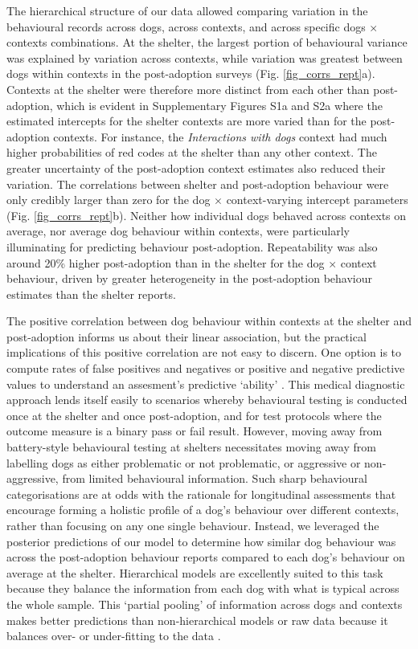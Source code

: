 \documentclass[fleqn,10pt]{wlscirep}
\begin{document}
The hierarchical structure of our data allowed comparing variation in the behavioural records across dogs, across contexts, and across specific dogs $\times$ contexts combinations. At the shelter, the largest portion of behavioural variance was explained by variation across contexts, while variation was greatest between dogs within contexts in the post-adoption surveys (Fig. \ref{fig_corrs_rept}a).  
Contexts at the shelter were therefore more distinct from each other than post-adoption, which is evident in Supplementary Figures S1a and S2a where the estimated intercepts for the shelter contexts are more varied than for the post-adoption contexts. For instance, the \textit{Interactions with dogs} context had much higher probabilities of red codes at the shelter than any other context. The greater uncertainty of the post-adoption context estimates also reduced their variation. 
The correlations between shelter and post-adoption behaviour were only credibly larger than zero for the dog $\times$ context-varying intercept parameters (Fig. \ref{fig_corrs_rept}b). Neither how individual dogs behaved across contexts on average, nor average dog behaviour within contexts, were particularly illuminating for predicting behaviour post-adoption. Repeatability was also around 20\% higher post-adoption than in the shelter for the dog $\times$ context behaviour, driven by greater heterogeneity in the post-adoption behaviour estimates than the shelter reports.

The positive correlation between dog behaviour within contexts at the shelter and post-adoption informs us about their linear association, but the practical implications of this positive correlation are not easy to discern. One option is to compute rates of false positives and negatives \cite{marder2013} or positive and negative predictive values \cite{patbrad2016} to understand an assesment's predictive `ability' \cite{patronek2019}. This medical diagnostic approach lends itself easily to scenarios whereby behavioural testing is conducted once at the shelter and once post-adoption, and for test protocols where the outcome measure is a binary pass or fail result. However, moving away from battery-style behavioural testing at shelters necessitates moving away from labelling dogs as either problematic or not problematic, or aggressive or non-aggressive, from limited behavioural information. Such sharp behavioural categorisations are at odds with the rationale for longitudinal assessments \cite{ASPCA2018,rayment2015} that encourage forming a holistic profile of a dog's behaviour over different contexts, rather than focusing on any one single behaviour. Instead, we leveraged the posterior predictions of our model to determine how similar dog behaviour was across the post-adoption behaviour reports compared to each dog's behaviour on average at the shelter. Hierarchical models are excellently suited to this task because they balance the information from each dog with what is typical across the whole sample. This `partial pooling' of information across dogs and contexts makes better predictions than non-hierarchical models or raw data because it balances over- or under-fitting to the data \cite{gelman2007, mcelreath2014}.
\end{document}
